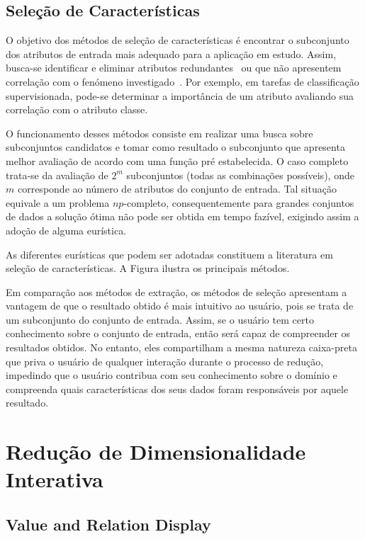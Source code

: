 
\subsection{Seleção de Características} 

O objetivo dos métodos de seleção de características é encontrar o subconjunto  dos atributos de entrada mais adequado para a aplicação em estudo. 
Assim, busca-se identificar e eliminar atributos redundantes~\cite{Kohavi1997} ou que não apresentem correlação com o fenómeno investigado~\cite{Nilsson2007}. 
Por exemplo, em tarefas de classificação supervisionada, pode-se determinar a importância de um atributo avaliando sua correlação com o atributo classe. 

O funcionamento desses métodos consiste em realizar uma busca sobre subconjuntos candidatos e tomar como resultado o subconjunto que apresenta melhor avaliação de acordo com uma função pré estabelecida. 
O caso completo trata-se da avaliação de $2^m$ subconjuntos (todas as combinações possíveis), onde $m$ corresponde ao número de atributos do conjunto de entrada. 
Tal situação equivale a um problema $np$-completo, consequentemente para grandes conjuntos de dados a solução ótima não pode ser obtida em tempo fazível, exigindo assim a adoção de alguma eurística. 

As diferentes eurísticas que podem ser adotadas constituem a literatura em seleção de características. A Figura ilustra os principais métodos.

Em comparação aos métodos de extração, os métodos de seleção apresentam a vantagem de que o resultado obtido é mais intuitivo ao usuário, pois se trata de um subconjunto do conjunto de entrada. 
Assim, se o usuário tem certo conhecimento sobre o conjunto de entrada, então será capaz de compreender os resultados obtidos.
No entanto, eles compartilham a mesma natureza caixa-preta que priva o usuário de qualquer interação durante o processo de redução, impedindo que o usuário contribua com seu conhecimento sobre o domínio e compreenda quais características dos seus dados foram responsáveis por aquele resultado.

\section{Redução de Dimensionalidade Interativa}

\subsection{Value and Relation Display}\label{sec:var}

